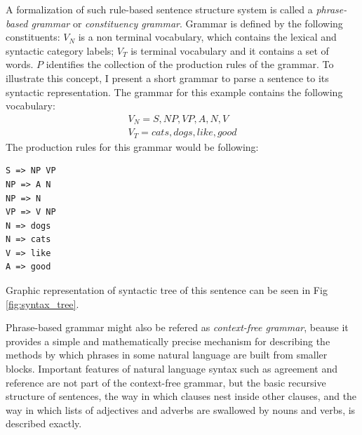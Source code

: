 A formalization of such rule-based sentence structure system is called a \emph{phrase-based grammar} or \emph{constituency grammar}. Grammar is defined by the following constituents:
$V_N$ is a non terminal vocabulary, which contains the lexical and syntactic category labels;
$V_T$ is terminal vocabulary and it contains a set of words.
$P$ identifies the collection of the production rules of the grammar.
To illustrate this concept, I present a short grammar to parse a sentence  to its syntactic representation. The grammar for this example contains the following vocabulary:
\begin{equation}
\begin{split}
V_N = {S, NP, VP, A, N, V}\\
V_T = {cats, dogs, like, good}
\end{split}
\end{equation}
The production rules for this grammar would be following:
\begin{verbatim}
S => NP VP
NP => A N
NP => N
VP => V NP
N => dogs
N => cats
V => like
A => good
\end{verbatim}
Graphic representation of syntactic tree  of this sentence can be seen in Fig \ref{fig:syntax_tree}.

Phrase-based grammar might also be refered as \emph{context-free grammar}, beause it provides a simple and mathematically precise mechanism for describing the methods by which phrases in some natural language are built from smaller blocks. Important features of natural language syntax such as agreement and reference are not part of the context-free grammar, but the basic recursive structure of sentences, the way in which clauses nest inside other clauses, and the way in which lists of adjectives and adverbs are swallowed by nouns and verbs, is described exactly.

